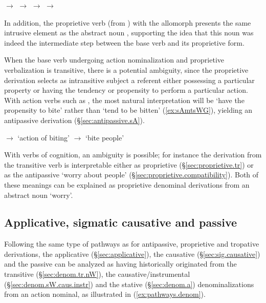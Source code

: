  \begin{exe}
\ex \label{ex:sAGmu.pathway}
\glt  {} $\rightarrow$  $\rightarrow$ 
\ex \label{ex:nAmpCAr.pathway}
\glt {} $\rightarrow$  $\rightarrow$ 
\end{exe}

In addition, the proprietive verb  (from  ) with the allomorph  presents the same intrusive  element as the abstract noun  , supporting the idea that this noun was indeed the intermediate step between the base verb and its proprietive form.
  
 When the base verb undergoing action nominalization and proprietive verbalization is transitive, there is a potential ambiguity, since the proprietive derivation selects as intransitive subject a referent either possessing a particular property or having the tendency or propensity to perform a particular action. With action verbs such as , the most natural interpretation will be `have the propensity to bite' rather than `tend to be bitten' (\ref{ex:sAmtsWG}), yielding an antipassive derivation (§\ref{sec:antipassive.sA}).
 
 \begin{exe}
\ex \label{ex:sAmtsWG}
\glt {} $\rightarrow$  `action of biting' $\rightarrow$  `bite people'
\end{exe}

With verbs of cognition, an ambiguity is possible; for instance the  derivation from the transitive verb  is interpretable either as proprietive  (§\ref{sec:proprietive.tr}) or as the antipassive `worry about people' (§\ref{sec:proprietive.compatibility}). Both of these meanings can be explained as proprietive denominal derivations from an abstract noun  `worry'.

\subsection{Applicative, sigmatic causative and passive} \label{sec:applicative.history} \label{sec:sW.caus.history} 
Following the same type of pathways as for antipassive, proprietive and tropative derivations, the applicative  (§\ref{sec:applicative}), the causative   (§\ref{sec:sig.causative}) and the passive  can be analyzed as having historically originated from the transitive  (§\ref{sec:denom.tr.nW}), the causative/instrumental   (§\ref{sec:denom.sW.caus.instr}) and the stative  (§\ref{sec:denom.a}) denominalizations from an action nominal, as illustrated in (\ref{ex:pathways.denom}).

